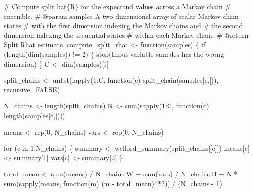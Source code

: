 \documentclass[
  letterpaper,
  DIV=11,
  numbers=noendperiod]{scrartcl}
\newenvironment{Shaded}{\begin{snugshade}}{\end{snugshade}}
\newcommand{\BuiltInTok}[1]{\textcolor[rgb]{0.00,0.23,0.31}{#1}}
\newcommand{\CommentTok}[1]{\textcolor[rgb]{0.37,0.37,0.37}{#1}}
\newcommand{\ControlFlowTok}[1]{\textcolor[rgb]{0.00,0.23,0.31}{#1}}
\newcommand{\DecValTok}[1]{\textcolor[rgb]{0.68,0.00,0.00}{#1}}
\newcommand{\KeywordTok}[1]{\textcolor[rgb]{0.00,0.23,0.31}{#1}}
\newcommand{\NormalTok}[1]{\textcolor[rgb]{0.00,0.23,0.31}{#1}}
\newcommand{\OperatorTok}[1]{\textcolor[rgb]{0.37,0.37,0.37}{#1}}
\newcommand{\StringTok}[1]{\textcolor[rgb]{0.13,0.47,0.30}{#1}}
\begin{document}
\begin{Shaded}
\begin{Highlighting}[]
\CommentTok{\# Compute split hat\{R\} for the expectand values across a Markov chain }
\CommentTok{\# ensemble.}
\CommentTok{\# @param samples A two{-}dimensional array of scalar Markov chain states }
\CommentTok{\#                with the first dimension indexing the Markov chains and }
\CommentTok{\#                the second dimension indexing the sequential states }
\CommentTok{\#                within each Markov chain.}
\CommentTok{\# @return Split Rhat estimate.}
\NormalTok{compute\_split\_rhat }\OperatorTok{\textless{}{-}}\NormalTok{ function(samples) \{}
  \ControlFlowTok{if}\NormalTok{ (length(dim(samples)) }\OperatorTok{!=} \DecValTok{2}\NormalTok{) \{}
\NormalTok{    stop(}\StringTok{\textquotesingle{}Input variable \textasciigrave{}samples\textasciigrave{} has the wrong dimension\textquotesingle{}}\NormalTok{)}
\NormalTok{  \}}
\NormalTok{  C }\OperatorTok{\textless{}{-}}\NormalTok{ dim(samples)[}\DecValTok{1}\NormalTok{]}
  
\NormalTok{  split\_chains }\OperatorTok{\textless{}{-}}\NormalTok{ unlist(lapply(}\DecValTok{1}\NormalTok{:C, }
\NormalTok{                                function(c) split\_chain(samples[c,])),}
\NormalTok{                         recursive}\OperatorTok{=}\NormalTok{FALSE)}

\NormalTok{  N\_chains }\OperatorTok{\textless{}{-}}\NormalTok{ length(split\_chains)}
\NormalTok{  N }\OperatorTok{\textless{}{-}} \BuiltInTok{sum}\NormalTok{(sapply(}\DecValTok{1}\NormalTok{:C, function(c) length(samples[c,])))}

\NormalTok{  means }\OperatorTok{\textless{}{-}}\NormalTok{ rep(}\DecValTok{0}\NormalTok{, N\_chains)}
  \BuiltInTok{vars} \OperatorTok{\textless{}{-}}\NormalTok{ rep(}\DecValTok{0}\NormalTok{, N\_chains)}

  \ControlFlowTok{for}\NormalTok{ (c }\KeywordTok{in} \DecValTok{1}\NormalTok{:N\_chains) \{}
\NormalTok{    summary }\OperatorTok{\textless{}{-}}\NormalTok{ welford\_summary(split\_chains[[c]])}
\NormalTok{    means[c] }\OperatorTok{\textless{}{-}}\NormalTok{ summary[}\DecValTok{1}\NormalTok{]}
    \BuiltInTok{vars}\NormalTok{[c] }\OperatorTok{\textless{}{-}}\NormalTok{ summary[}\DecValTok{2}\NormalTok{]}
\NormalTok{  \}}

\NormalTok{  total\_mean }\OperatorTok{\textless{}{-}} \BuiltInTok{sum}\NormalTok{(means) }\OperatorTok{/}\NormalTok{ N\_chains}
\NormalTok{  W }\OperatorTok{=} \BuiltInTok{sum}\NormalTok{(}\BuiltInTok{vars}\NormalTok{) }\OperatorTok{/}\NormalTok{ N\_chains}
\NormalTok{  B }\OperatorTok{=}\NormalTok{ N }\OperatorTok{*} \BuiltInTok{sum}\NormalTok{(sapply(means, function(m)}
\NormalTok{                            (m }\OperatorTok{{-}}\NormalTok{ total\_mean)}\OperatorTok{**}\DecValTok{2}\NormalTok{)) }\OperatorTok{/}\NormalTok{ (N\_chains }\OperatorTok{{-}} \DecValTok{1}\NormalTok{)}


\end{Highlighting}
\end{Shaded}
\end{document}
